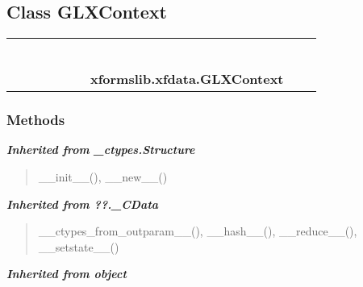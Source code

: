 \subsection{Class GLXContext}

    \label{xformslib:xfdata:GLXContext}
\begin{tabular}{cccccccccc}
\multicolumn{2}{r}{\settowidth{\BCL}{object}\multirow{2}{\BCL}{object}}
&&
&&
&&
  \\\cline{3-3}
  &&\multicolumn{1}{c|}{}
&&
&&
&&
  \\
\multicolumn{4}{r}{\settowidth{\BCL}{??.\_CData}\multirow{2}{\BCL}{??.\_CData}}
&&
&&
  \\\cline{5-5}
  &&&&\multicolumn{1}{c|}{}
&&
&&
  \\
\multicolumn{6}{r}{\settowidth{\BCL}{\_ctypes.Structure}\multirow{2}{\BCL}{\_ctypes.Structure}}
&&
  \\\cline{7-7}
  &&&&&&\multicolumn{1}{c|}{}
&&
  \\
&&&&&&\multicolumn{2}{l}{\textbf{xformslib.xfdata.GLXContext}}
\end{tabular}



  \subsubsection{Methods}


\large{\textbf{\textit{Inherited from \_ctypes.Structure}}}

\begin{quote}
\_\_init\_\_(), \_\_new\_\_()
\end{quote}

\large{\textbf{\textit{Inherited from ??.\_CData}}}

\begin{quote}
\_\_ctypes\_from\_outparam\_\_(), \_\_hash\_\_(), \_\_reduce\_\_(), \_\_setstate\_\_()
\end{quote}

\large{\textbf{\textit{Inherited from object}}}

